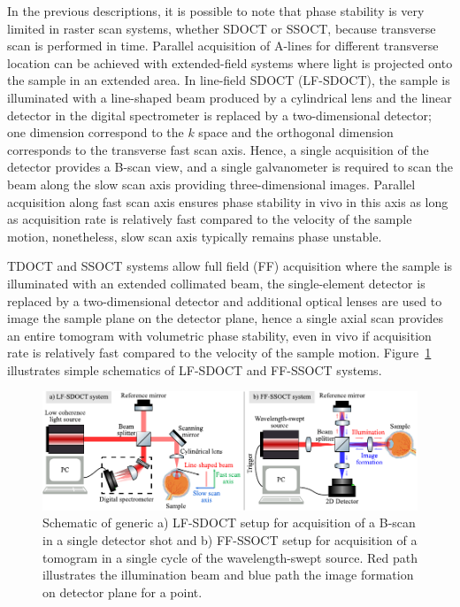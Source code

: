 In the previous descriptions, it is possible to note that phase stability is very limited in raster scan systems, whether SDOCT or SSOCT, because transverse scan is performed in time. Parallel acquisition of A-lines for different transverse location can be achieved with extended-field systems where light is projected onto the sample in an extended area. In line-field SDOCT (LF-SDOCT), the sample is illuminated with a line-shaped beam produced by a cylindrical lens and the linear detector in the digital spectrometer is replaced by a two-dimensional detector; one dimension correspond to the $k$ space and the orthogonal dimension corresponds to the transverse fast scan axis. Hence, a single acquisition of the detector provides a B-scan view, and a single galvanometer is required to scan the beam along the slow scan axis providing three-dimensional images. Parallel acquisition along fast scan axis ensures phase stability in vivo in this axis as long as acquisition rate is relatively fast compared to the velocity of the sample motion, nonetheless, slow scan axis typically remains phase unstable.

TDOCT and SSOCT systems allow full field (FF) acquisition where the sample is illuminated with an extended collimated beam, the single-element detector is replaced by a two-dimensional detector and additional optical lenses are used to image the sample plane on the detector plane, hence a single axial scan provides an entire tomogram with volumetric phase stability, even in vivo if acquisition rate is relatively fast compared to the velocity of the sample motion. Figure~\ref{fig:LF_FFOCT_Scheme} illustrates simple schematics of LF-SDOCT and FF-SSOCT systems.

\begin{figure}
    \centering
    \includegraphics[width=\textwidth]{Figures/TheoreticalBasis/LF_FFOCT_Scheme.pdf}
    \caption{Schematic of generic a) LF-SDOCT setup for acquisition of a B-scan in a single detector shot and b) FF-SSOCT setup for acquisition of a tomogram in a single cycle of the wavelength-swept source. Red path illustrates the illumination beam and blue path the image formation on detector plane for a point.}
    \label{fig:LF_FFOCT_Scheme}
\end{figure}


